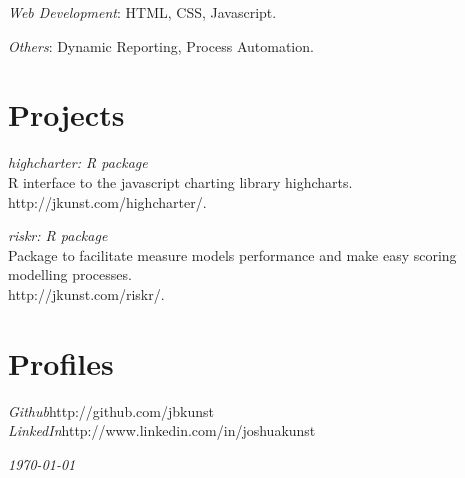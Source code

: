 \documentclass[margin]{res}
\begin{document}
\begin{resume}
    {\sl Web Development}: HTML, CSS, Javascript.
    
    {\sl Others}: Dynamic Reporting, Process Automation.

\vspace{1cm}

\newpage

\section{Projects}


    {\sl highcharter: R package}\\
    R interface to the javascript charting library highcharts.\\
    http://jkunst.com/highcharter/.
    
    {\sl riskr: R package}\\
    Package to facilitate measure models performance and make easy scoring modelling processes.\\
    http://jkunst.com/riskr/.
    

\vspace{1cm}

\section{Profiles}
    
    {\sl Github}\hfill http://github.com/jbkunst\\
    
    {\sl LinkedIn}\hfill http://www.linkedin.com/in/joshuakunst

\vspace{1cm}


\end{resume}

\vspace{0.5cm}

\hfill {\sl \today}
\end{document}
